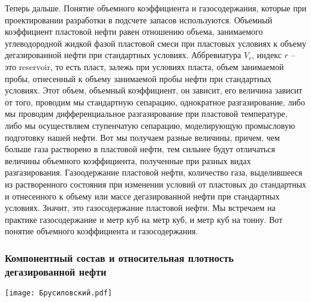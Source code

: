 \documentclass[main.tex]{subfiles}
\begin{document}
Теперь дальше.
Понятие объемного коэффициента и газосодержания, которые при проектировании разработки в подсчете запасов используются.
Объемный коэффициент пластовой нефти равен отношению объема, занимаемого углеводородной жидкой фазой пластовой смеси при пластовых условиях к объему дегазированной нефти при стандартных условиях.
Аббревиатура $V_r$, индекс $r$ -- это reservoir, то есть пласт, залежь при условиях пласта, объем занимаемой пробы, отнесенный к объему занимаемой пробы нефти при стандартных условиях.
Этот объем, объемный коэффициент, он зависит, его величина зависит от того, проводим мы стандартную сепарацию, однократное разгазирование, либо мы проводим дифференциальное разгазирование при пластовой температуре, либо мы осуществляем ступенчатую сепарацию, моделирующую промысловую подготовку нашей нефти.
Вот мы получаем разные величины, причем, чем больше газа растворено в пластовой нефти, тем сильнее будут отличаться величины объемного коэффициента, полученные при разных видах разгазирования.
Газоодержание пластовой нефти, количество газа, выделившееся из растворенного состояния при изменении условий от пластовых до стандартных и отнесенного к объему или массе дегазированной нефти при стандартных условиях.
Значит, это газосодержание пластовой нефти.
Мы встречаем на практике газосодержание и метр куб на метр куб, и метр куб на тонну.
Вот понятие объемного коэффициента и газосодержания.

\subsubsection{Компонентный состав и относительная плотность дегазированной нефти}

\begin{center}
\texttt{[image: Брусиловский.pdf]}
\end{center}
\end{document}
